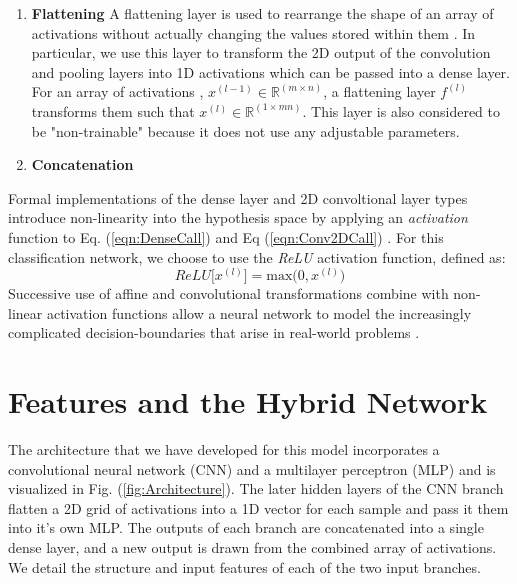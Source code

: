 \documentclass[conference,onecolumn,letterpaper]{IEEEtran}
\begin{document}
\begin{enumerate}
\item\textbf{Flattening}
A flattening layer is used to rearrange the shape of an array of activations without actually changing the values stored within them \cite{Tensorflow}. In particular, we use this layer to transform the 2D output of the convolution and pooling layers into 1D activations which can be passed into a dense layer. For an array of activations , $x^{(l-1)} \in \mathbb{R}^{(m \times n)}$, a flattening layer $f^{(l)}$ transforms them such that $x^{(l)} \in \mathbb{R}^{(1 \times mn)}$. This layer is also considered to be "non-trainable" because it does not use any adjustable parameters.

\item\textbf{Concatenation}


\end{enumerate}

Formal implementations of the dense layer and 2D convoltional layer types introduce non-linearity into the hypothesis space by applying an \textit{activation} function to Eq. (\ref{eqn:DenseCall}) and Eq (\ref{eqn:Conv2DCall}) \cite{Goodfellow}. For this classification network, we choose to use the \textit{ReLU} activation function, defined as:
\begin{equation}
\label{eqn:ReLU}
ReLU \big[ x^{(l)} \big] = \text{max} \big( 0, x^{(l)} \big)
\end{equation} 
Successive use of affine and convolutional transformations combine with non-linear activation functions allow a neural network to model the increasingly complicated decision-boundaries that arise in real-world problems \cite{Geron,Goodfellow}.


\section{Features and the Hybrid Network}
\label{sec:Features}

The architecture that we have developed for this model incorporates a convolutional neural network (CNN) and a multilayer perceptron (MLP) and is visualized in Fig. (\ref{fig:Architecture}). The later hidden layers of the CNN branch flatten a 2D grid of activations into a 1D vector for each sample and pass it them into it's own MLP. The outputs of each branch are concatenated into a single dense layer, and a new output is drawn from the combined array of activations. We detail the structure and input features of each of the two input branches.
\end{document}
